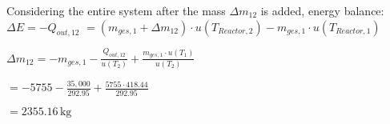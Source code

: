 Considering the entire system after the mass \( \Delta m_{12} \) is added, energy balance:  
\( \Delta E = -Q_{out,12} \)  
\( = (m_{ges,1} + \Delta m_{12}) \cdot u(T_{Reactor,2}) - m_{ges,1} \cdot u(T_{Reactor,1}) \)  

\( \Delta m_{12} = -m_{ges,1} - \frac{Q_{out,12}}{u(T_2)} + \frac{m_{ges,1} \cdot u(T_1)}{u(T_2)} \)  

\( = -5755 - \frac{35,000}{292.95} + \frac{5755 \cdot 418.44}{292.95} \)  

\( = 2355.16 \, \text{kg} \)